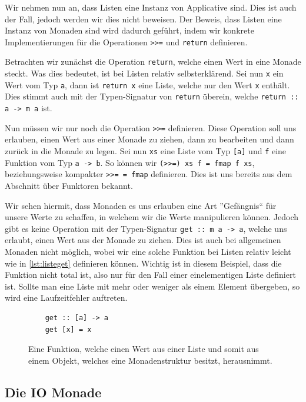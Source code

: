 \documentclass{hhuarticle}
\theoremstyle{definition}
\theoremstyle{theorem}
\begin{document}
  Wir nehmen nun an, dass Listen eine Instanz von Applicative sind.
  Dies ist auch der Fall, jedoch werden wir dies nicht beweisen. Der
  Beweis, dass Listen eine Instanz von Monaden sind wird dadurch geführt,
  indem wir konkrete Implementierungen für die Operationen
  \verb|>>=| und \verb|return| definieren.

  Betrachten wir zunächst die Operation \verb|return|, welche einen
  Wert in eine Monade steckt. Was dies bedeutet, ist bei Listen relativ
  selbsterklärend. Sei nun \verb|x| ein Wert vom Typ \verb|a|, dann
  ist \verb|return x| eine Liste, welche nur den Wert \verb|x| enthält.
  Dies stimmt auch mit der Typen-Signatur von \verb|return| überein,
  welche \verb|return :: a -> m a| ist.

  Nun müssen wir nur noch die Operation \verb|>>=| definieren. Diese
  Operation soll uns erlauben, einen Wert aus einer Monade zu ziehen,
  dann zu bearbeiten und dann zurück in die Monade zu legen.
  Sei nun \verb|xs| eine Liste vom Typ \verb|[a]| und \verb|f| eine
  Funktion vom Typ \verb|a -> b|. So können wir \verb|(>>=) xs f = fmap f xs|,
  beziehungsweise kompakter \verb|>>= = fmap| definieren. Dies ist
  uns bereits aus dem Abschnitt über Funktoren bekannt.

  Wir sehen hiermit, dass Monaden es uns erlauben eine Art ''Gefängnis``
  für unsere Werte zu schaffen, in welchem wir die Werte manipulieren
  können. Jedoch gibt es keine Operation mit der Typen-Signatur
  \verb|get :: m a -> a|, welche uns erlaubt, einen Wert aus der
  Monade zu ziehen. Dies ist auch bei allgemeinen Monaden nicht möglich,
  wobei wir eine solche Funktion bei Listen relativ leicht wie in
  \cref{lst:listeget} definieren können. Wichtig ist in diesem Beispiel,
  dass die Funktion nicht total ist, also nur für den Fall einer einelementigen
  Liste definiert ist. Sollte man eine Liste mit mehr oder weniger als
  einem Element übergeben, so wird eine Laufzeitfehler auftreten.

  \begin{figure}[h]
    \begin{lstlisting}
    get :: [a] -> a
    get [x] = x
    \end{lstlisting}
    \caption{Eine Funktion, welche einen Wert aus einer Liste und somit aus einem Objekt, welches eine Monadenstruktur besitzt, herausnimmt.}%
    \label{fig:listget}
  \end{figure}

  \subsection{Die IO Monade}
\end{document}
